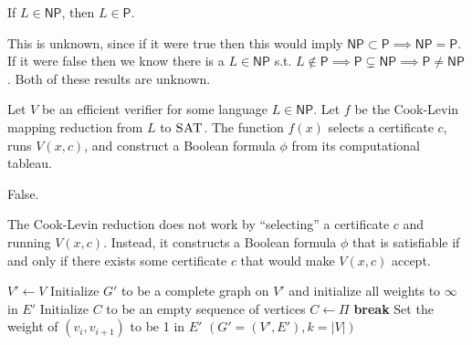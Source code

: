 \documentclass[12pt, letterpaper]{article}
\renewcommand{\P}{\mathsf{P}}
\newcommand{\NP}{\mathsf{NP}}
\begin{document}
\begin{subproblem}{}
    If $L\in\NP$, then $L \in \P$.
\end{subproblem}
\begin{problemproof}
    This is unknown, since if it were true then this would imply $\NP \subset \P \implies \NP = \P$. If it were false then we know there is a $L \in \NP$ s.t. $L \notin \P \implies \P \subsetneq \NP \implies \P \neq \NP$. Both of these results are unknown.
\end{problemproof}
\newcommand{\SAT}{\textsc{SAT}}
\begin{subproblem}{}
    Let $V$ be an efficient verifier for some language $L \in \NP$. Let $f$ be the Cook-Levin mapping reduction from $L$ to $\SAT$. The function $f(x)$ selects a certificate $c$, runs $V(x,c)$, and construct a Boolean formula $\phi$ from its computational tableau. 
\end{subproblem}
\begin{problemproof}
    False.

The Cook-Levin reduction does not work by “selecting” a certificate \( c \) and running \( V(x,c) \). Instead, it constructs a Boolean formula \(\phi\) that is satisfiable if and only if there exists some certificate \( c \) that would make \( V(x,c) \) accept.
\end{problemproof}
\newcommand{\TSP}{\textsc{TSP}}
\newcommand{\HC}{\textsc{HAMCYCLE}}
\newcommand{\ptimemap}{\leq_p}
\newcommand{\set}[1]{\{#1\}}
\begin{subproblem}{}
      \begin{minipage}{0.9\textwidth}
      \begin{center}
    \begin{algorithm}[H]
      \begin{algorithmic}[1]
        \State $V' \gets V$
        \State Initialize $G'$ to be a complete graph on $V'$ and initialize all weights to $\infty$ in $E'$
        \State Initialize $C$ to be an empty sequence of vertices
                \State $C \gets \Pi$
                \State \textbf{break}
            \EndIf
        \EndFor
            \State Set the weight of $(v_i, v_{i+1})$ to be 1 in $E'$
        \EndFor
        \State \Return $(G'=(V', E'), k=|V|)$
        \EndFunction
      \end{algorithmic}
    \end{algorithm}
    \end{center}
    \end{minipage}
\end{subproblem}
\end{document}
